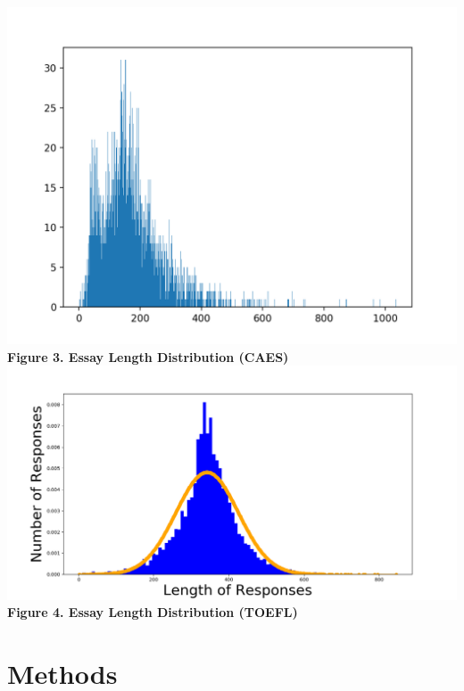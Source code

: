 \documentclass[12pt]{article}
\begin{document}
 \begin{center}
 	\includegraphics[scale=0.8]{lengthD}\\
 	\textbf{Figure 3. Essay Length Distribution (CAES)}
 	\includegraphics[scale=0.4]{Figure1}\\
 	\textbf{Figure 4. Essay Length Distribution (TOEFL)}
 \end{center}

 \section{Methods}
\end{document}
